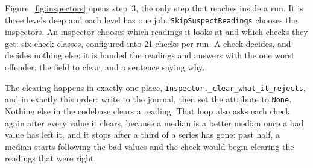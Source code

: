 Figure~\ref{fig:inspectors} opens step~3, the only step that reaches inside a run. It is
three levels deep and each level has one job. \texttt{SkipSuspectReadings} chooses the
inspectors. An inspector chooses which readings it looks at and which checks they get: six
check classes, configured into 21 checks per run. A check decides, and decides nothing else:
it is handed the readings and answers with the one worst offender, the field to clear, and a
sentence saying why.

The clearing happens in exactly one place, \texttt{Inspector.\_clear\_what\_it\_rejects},
and in exactly this order: write to the journal, then set the attribute to \texttt{None}.
Nothing else in the codebase clears a reading. That loop also asks each check again after
every value it clears, because a median is a better median once a bad value has left it, and
it stops after a third of a series has gone: past half, a median starts following the bad
values and the check would begin clearing the readings that were right.

